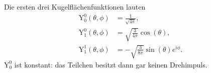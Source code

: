 Die ersten drei Kugelflächenfunktionen lauten
\begin{align}
	\text{Y}^0_0(\theta,\phi) &= \frac{1}{\sqrt{4\pi}}, \\
	\text{Y}^0_1(\theta,\phi) &= \sqrt{\frac{3}{4\pi}}\cos(\theta), \\
	\text{Y}^1_1(\theta,\phi) &= -\sqrt{\frac{3}{8\pi}}\sin(\theta)e^{i\phi}.
\end{align}
$\text{Y}^0_0$ ist konstant: das Teilchen besitzt dann gar keinen Drehimpuls.
